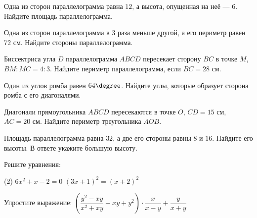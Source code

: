 \begin{class}[number=7]
	\begin{listofex}
		\item Одна из сторон параллелограмма равна \( 12 \), а высота, опущенная на неё --- \( 6 \). Найдите площадь параллелограмма.
		\item Одна из сторон параллелограмма в \( 3 \) раза меньше другой, а его периметр равен \( 72 \) см. Найдите стороны параллелограмма.
		\item Биссектриса угла \( D \) параллелограмма \( ABCD \) пересекает сторону \( BC \) в точке \( M \), \( BM:MC=4:3 \). Найдите периметр параллелограмма, если \( BC=28 \) см.
		\item Один из углов ромба равен \( 64\degree \). Найдите углы, которые образует сторона ромба с его диагоналями.
		\item Диагонали прямоугольника \( ABCD \) пересекаются в точке \( O \), \( CD=15 \) см, \( AC=20 \) см. Найдите периметр треугольника \( AOB \).
		\item  Площадь параллелограмма равна \( 32 \), а две его стороны равны \( 8 \) и \( 16 \). Найдите его высоты. В ответе укажите большую высоту.
		\item Решите уравнения:
		\begin{tasks}(2)
			\task \( 6x^2+x-2=0 \)
			\task \( (3x+1)^2=(x+2)^2 \)
		\end{tasks}
		\item Упростите выражение: \quad \( \left( \dfrac{y^2-xy}{x^2+xy}-xy+y^2 \right)\cdot\dfrac{x}{x-y}+\dfrac{y}{x+y} \)
	\end{listofex}
\end{class}

